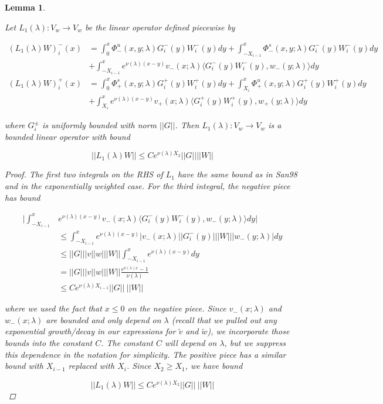 \documentclass[12pt]{article}
\newtheorem{lemma}{Lemma}
\begin{document}
\begin{lemma}\label{L1}

Let $L_1(\lambda): V_w \rightarrow V_w$ be the linear operator defined piecewise by

\begin{align*}
(L_1(\lambda)W)_i^-(x) &= \int_0^x \Phi^u_-(x, y; \lambda) G_i^-(y)W_i^-(y) dy + \int_{-X_{i-1}}^x \Phi^s_-(x, y; \lambda) G_i^-(y)W_i^-(y) dy \\
&+ \int_{-X_{i-1}}^x 
e^{\nu(\lambda)(x-y)} v_-(x; \lambda) \langle G_i^-(y)W_i^-(y), w_-(y; \lambda) \rangle dy \\
(L_1(\lambda)W)_i^+(x) &= \int_0^x \Phi^s_+(x, y; \lambda) G_i^+(y) W_i^+(y) dy + \int_{X_i}^x \Phi^u_+(x, y; \lambda) G_i^+(y) W_i^+(y) dy \\
&+ \int_{X_i}^x e^{\nu(\lambda)(x-y)} v_+(x; \lambda) \langle G_i^+(y)W_i^+(y), w_+(y; \lambda) \rangle dy
\end{align*}

where $G_i^\pm$ is uniformly bounded with norm $||G||$. Then $L_1(\lambda): V_w \rightarrow V_w$ is a bounded linear operator with bound

\begin{equation}\label{L1bound}
||L_1(\lambda)W|| \leq C e^{\nu(\lambda)X_2} ||G|| ||W||
\end{equation}

\begin{proof}
The first two integrals on the RHS of $L_1$ have the same bound as in San98 and in the exponentially weighted case. For the third integral, the negative piece has bound

\begin{align*}
\Big| \int_{-X_{i-1}}^x &e^{\nu(\lambda)(x-y)} v_-(x; \lambda) \langle G_i^-(y)W_i^-(y), w_-(y; \lambda) \rangle dy \Big| \\
&\leq \int_{-X_{i-1}}^x e^{\nu(\lambda)(x-y)} |v_-(x; \lambda)| |G_i^-(y)|||W|||w_-(y; \lambda)|dy \\
&\leq ||G|||v||w|||W|| \int_{-X_{i-1}}^x e^{\nu(\lambda)(x-y)} dy \\
&= ||G|||v||w|||W|| \frac{e^{\nu(\lambda)x} - 1}{\nu(\lambda)} \\
&\leq C e^{\nu(\lambda)X_{i-1}} ||G|| \: ||W||
\end{align*}

where we used the fact that $x \leq 0$ on the negative piece. Since $v_-(x; 
\lambda)$ and $w_-(x; \lambda)$ are bounded and only depend on $\lambda$ (recall that we pulled out any exponential growth/decay in our expressions for $\tilde{v}$ and $\tilde{w}$), we incorporate those bounds into the constant $C$. The constant $C$ will depend on $\lambda$, but we suppress this dependence in the notation for simplicity. The positive piece has a similar bound with $X_{i-1}$ replaced with $X_i$. Since $X_2 \geq X_1$, we have bound

\[
||L_1(\lambda)W|| \leq C e^{\nu(\lambda)X_2} ||G|| \: ||W||
\]
\end{proof}
\end{lemma}
\end{document}
